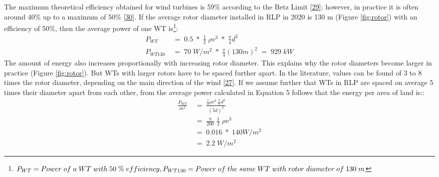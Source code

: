\documentclass[a4paper,11pt]{article}
\begin{document}
The maximum theoretical efficiency obtained for wind turbines is 59\% according to the Betz Limit {[}\protect\hyperlink{ref-A.Betz.1920}{29}{]}; however, in practice it is often around 40\% up to a maximum of 50\% {[}\protect\hyperlink{ref-WindwartsEnergieausdemNorden.2021}{30}{]}. If the average rotor diameter installed in RLP in 2020 is 130 m (Figure \ref{fig:rotor}) with an efficiency of 50\%, then the average power of one WT is\footnote{\(P_{WT}=Power\; of\; a\; WT\; with\; 50\; \%\; efficiency,\;\\ P_{WT130}=Power\; of\; the\; same\; WT\; with\; rotor\; diameter\; of\; 130\; m\)}:
\begin{equation}
\begin{split}
P_{WT}\; & =\; 0.5\; *\; \frac{1}{2}\; \rho v^3\; *\; \frac{\pi}{4}d^2 \\
P_{WT130}\; & =\; 70\; W/m^2\; *\; \frac{\pi}{4}(130 m)^2\; =\; 929\; kW
\end{split}
\end{equation}
The amount of energy also increases proportionally with increasing rotor diameter. This explains why the rotor diameters become larger in practice (Figure \ref{fig:rotor}). But WTs with larger rotors have to be spaced further apart. In the literature, values can be found of 3 to 8 times the rotor diameter, depending on the main direction of the wind {[}\protect\hyperlink{ref-DavidJCMacKay.2009}{27}{]}. If we assume further that WTs in RLP are spaced on average 5 times their diameter apart from each other, from the average power calculated in Equation 5 follows that the energy per area of land is::
\begin{equation}
\begin{split}
\frac{P_{WT}}{m^2}\; & =\; \frac{\frac{1}{2} \rho v^3\; \frac{\pi}{8}d^2}{(5d)^2} \\
 & =\; \frac{\pi}{200}\; \frac{1}{2}\; \rho v^3 \\
 & =\; 0.016\; *\; 140 W/m^2 \\
 & =\; 2.2\; W/m^2
\end{split}
\end{equation}
\end{document}
